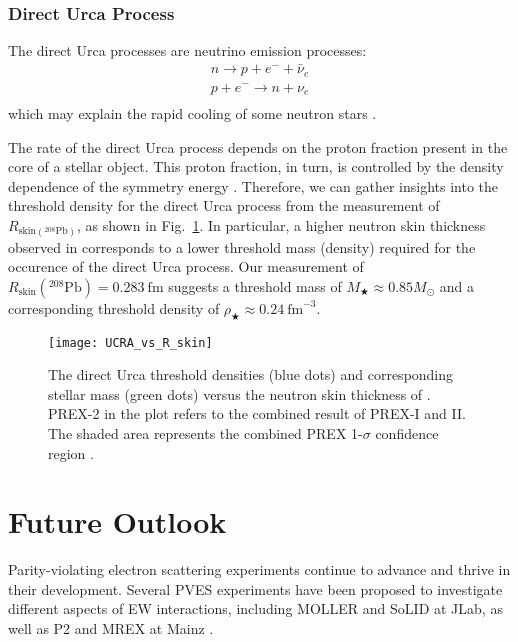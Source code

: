 \subsubsection{Direct Urca Process}
The direct Urca processes are neutrino emission processes: 
\begin{equation}
    \begin{gathered}
	n \rightarrow p + e^- + \bar{\nu}_e \\
	p + e^- \rightarrow n + \nu_e \\
    \end{gathered}
\end{equation}
which may explain the rapid cooling of some neutron stars \cite{Haensel1995}. 

The rate of the direct Urca process depends on the proton fraction present in the core
of a stellar object. This proton fraction, in turn, is controlled by the density dependence of 
the symmetry energy \cite{PhysRevLett.120.182701}. Therefore, we can gather insights
into the threshold density for the direct Urca process from the measurement of $R_{\text{skin}({}^{208}\text{Pb})}$,
as shown in Fig.~\ref{fig:DUrca}. 
In particular, a higher neutron skin thickness observed in \Pb corresponds to a
lower threshold mass (density) required for the occurence of the direct Urca process. 
Our measurement of $R_{\text{skin}}({}^{208}\text{Pb}) = 0.283\ \mathrm{fm}$
suggests a threshold mass of $M_\bigstar \approx 0.85 M_\odot$ and a corresponding
threshold density of $\rho_\bigstar \approx 0.24\ \mathrm{fm}^{-3}$.
\begin{figure}[!h]
    \centering
    \texttt{[image: UCRA\_vs\_R\_skin]}
    \caption[Direct Urca threshold]
    {The direct Urca threshold densities (blue dots) and corresponding 
    stellar mass (green dots) versus the neutron skin thickness of \Pb. PREX-2 
    in the plot refers to the combined result of PREX-I and II.
    The shaded area represents the combined PREX 1-$\sigma$ confidence region \cite{PhysRevLett.126.172503}.}
    \label{fig:DUrca}
\end{figure}

\section{Future Outlook}
Parity-violating electron scattering experiments continue to advance and thrive
in their development.
Several PVES experiments have been proposed to investigate different aspects of EW
interactions, including MOLLER \cite{MOLLER} and SoLID \cite{SoLID} at JLab, 
as well as P2 and MREX at Mainz \cite{Becker2018}.

